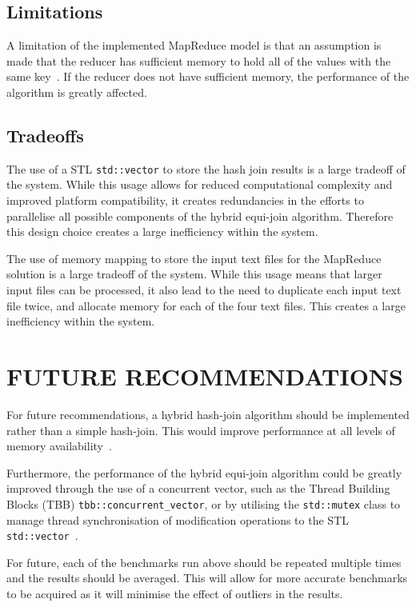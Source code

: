 \documentclass[12pt,twocolumn]{witseiepaper}
\begin{document}
\subsection{Limitations}
A limitation of the implemented MapReduce model is that an assumption is made that the reducer has sufficient memory to hold all of the values with the same key~\cite{mapReduceJoin}. If the reducer does not have sufficient memory, the performance of the algorithm is greatly affected.

\subsection{Tradeoffs} \label{sec:tradeoffs}
The use of a STL \texttt{std::vector} to store the hash join results is a large tradeoff of the system. While this usage allows for reduced computational complexity and improved platform compatibility, it creates redundancies in the efforts to parallelise all possible components of the hybrid equi-join algorithm. Therefore this design choice creates a large inefficiency within the system.

The use of memory mapping to store the input text files for the MapReduce solution is a large tradeoff of the system. While this usage means that larger input files can be processed, it also lead to the need to duplicate each input text file twice, and allocate memory for each of the four text files. This creates a large inefficiency within the system.

\section{FUTURE RECOMMENDATIONS}
For future recommendations, a hybrid hash-join algorithm should be implemented rather than a simple hash-join. This would improve performance at all levels of memory availability~\cite{evaluating4JoinAlgorithms}.

Furthermore, the performance of the hybrid equi-join algorithm could be greatly improved through the use of a concurrent vector, such as the Thread Building Blocks (TBB) \texttt{tbb::concurrent\_vector}, or by utilising the \texttt{std::mutex} class to manage thread synchronisation of modification operations to the STL \texttt{std::vector}~\cite{tbb,mutex}.

For future, each of the benchmarks run above should be repeated multiple times and the results should be averaged. This will allow for more accurate benchmarks to be acquired as it will minimise the effect of outliers in the results.
\end{document}

